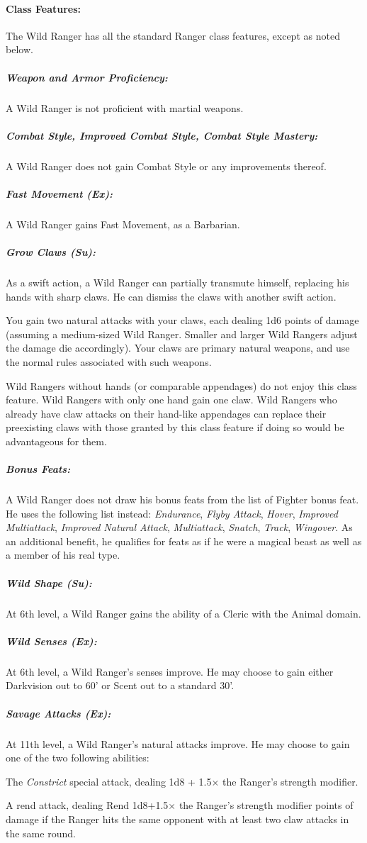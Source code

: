 \paragraph{Class Features:}
The Wild Ranger has all the standard Ranger class features, except as noted below.
\subparagraph{Weapon and Armor Proficiency:} 
A Wild Ranger is not proficient with martial weapons.

\subparagraph{Combat Style, Improved Combat Style, Combat Style Mastery:}
A Wild Ranger does not gain Combat Style or any improvements thereof.

\subparagraph{Fast Movement (Ex):}
A Wild Ranger gains Fast Movement, as a Barbarian.

\subparagraph{Grow Claws (Su):}
As a swift action, a Wild Ranger can partially transmute himself, replacing his hands with sharp claws. He can dismiss the claws with another swift action.

You gain two natural attacks with your claws, each dealing 1d6 points of damage (assuming a medium-sized Wild Ranger. Smaller and larger Wild Rangers adjust the damage die accordingly). Your claws are primary natural weapons, and use the normal rules associated with such weapons.

Wild Rangers without hands (or comparable appendages) do not enjoy this class feature. Wild Rangers with only one hand gain one claw. Wild Rangers who already have claw attacks on their hand-like appendages can replace their preexisting claws with those granted by this class feature if doing so would be advantageous for them.

\subparagraph{Bonus Feats:} A Wild Ranger does not draw his bonus feats from the list of Fighter bonus feat. He uses the following list instead: \emph{Endurance}, \emph{Flyby Attack}, \emph{Hover}, \emph{Improved Multiattack}, \emph{Improved Natural Attack}, \emph{Multiattack}, \emph{Snatch}, \emph{Track}, \emph{Wingover}. As an additional benefit, he qualifies for feats as if he were a magical beast as well as a member of his real type.

\subparagraph{Wild Shape (Su):} At 6th level, a Wild Ranger gains the  ability of a Cleric with the Animal domain.

\subparagraph{Wild Senses (Ex):} At 6th level, a Wild Ranger's senses improve. He may choose to gain either Darkvision out to 60' or Scent out to a standard 30'.

\subparagraph{Savage Attacks (Ex): } At 11th level, a Wild Ranger's natural attacks improve. He may choose to gain one of the two following abilities:
\begin{list}{}{\leftmargin=1em}
 \item The \emph{Constrict} special attack, dealing 1d8 + 1.5$\times$ the Ranger's strength modifier.
 \item A rend attack, dealing Rend 1d8+1.5$\times$ the Ranger's strength modifier points of damage if the Ranger hits the same opponent with at least two claw attacks in the same round.
\end{list}
